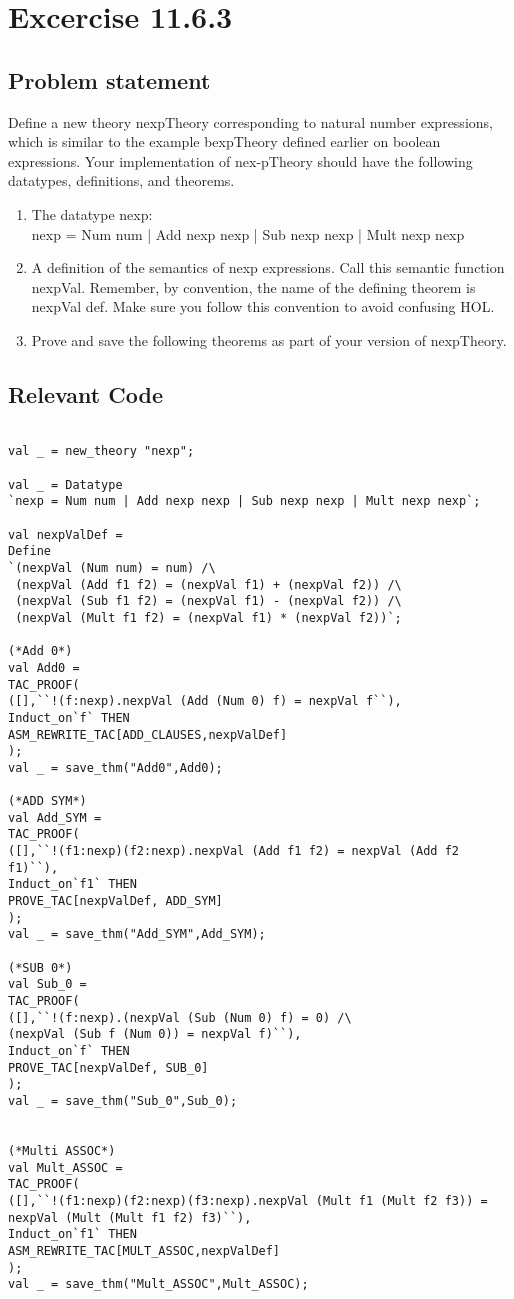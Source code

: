 \documentclass{report}
\begin{document}
\chapter{Excercise 11.6.3}
\label{cha:11.6.3}


\section{Problem statement}
\label{problem-statement-11-6-3}
Define a new theory nexpTheory corresponding to natural number expressions, which is similar to the example bexpTheory defined earlier on boolean expressions. Your implementation of nex-pTheory should have the following datatypes, definitions, and theorems.
\begin{enumerate}
\item The datatype nexp:
\\
nexp = Num num | Add nexp nexp | Sub nexp nexp | Mult nexp nexp
\\
\item A definition of the semantics of nexp expressions. Call this semantic function nexpVal. Remember, by
convention, the name of the defining theorem is nexpVal def. Make sure you follow this convention to avoid confusing HOL.
\item Prove and save the following theorems as part of your version of nexpTheory.
\end{enumerate}
\section{Relevant Code}
\label{rel-code-11-6-3}
\begin{lstlisting}[frame=TBlr]

val _ = new_theory "nexp";

val _ = Datatype
`nexp = Num num | Add nexp nexp | Sub nexp nexp | Mult nexp nexp`;

val nexpValDef =
Define
`(nexpVal (Num num) = num) /\
 (nexpVal (Add f1 f2) = (nexpVal f1) + (nexpVal f2)) /\
 (nexpVal (Sub f1 f2) = (nexpVal f1) - (nexpVal f2)) /\
 (nexpVal (Mult f1 f2) = (nexpVal f1) * (nexpVal f2))`;

(*Add 0*)
val Add0 = 
TAC_PROOF(
([],``!(f:nexp).nexpVal (Add (Num 0) f) = nexpVal f``),
Induct_on`f` THEN
ASM_REWRITE_TAC[ADD_CLAUSES,nexpValDef]
);
val _ = save_thm("Add0",Add0);

(*ADD SYM*)
val Add_SYM = 
TAC_PROOF(
([],``!(f1:nexp)(f2:nexp).nexpVal (Add f1 f2) = nexpVal (Add f2 f1)``),
Induct_on`f1` THEN
PROVE_TAC[nexpValDef, ADD_SYM]
);
val _ = save_thm("Add_SYM",Add_SYM);

(*SUB 0*)
val Sub_0 =
TAC_PROOF(
([],``!(f:nexp).(nexpVal (Sub (Num 0) f) = 0) /\
(nexpVal (Sub f (Num 0)) = nexpVal f)``),
Induct_on`f` THEN
PROVE_TAC[nexpValDef, SUB_0]
);
val _ = save_thm("Sub_0",Sub_0);


(*Multi ASSOC*)
val Mult_ASSOC = 
TAC_PROOF(
([],``!(f1:nexp)(f2:nexp)(f3:nexp).nexpVal (Mult f1 (Mult f2 f3)) =
nexpVal (Mult (Mult f1 f2) f3)``),
Induct_on`f1` THEN
ASM_REWRITE_TAC[MULT_ASSOC,nexpValDef]
);
val _ = save_thm("Mult_ASSOC",Mult_ASSOC);
\end{lstlisting}
\end{document}
